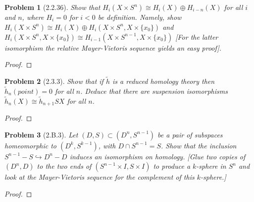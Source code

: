 \documentclass[10pt]{article}
\newcommand{\sk}{\vskip 10mm}
\newcommand{\rh}{\widetilde{h}}
\theoremstyle{plain}
\newtheorem{problem}{Problem}
\theoremstyle{remark}
\begin{document}
\begin{problem}[2.2.36]
  Show that $H_i(X\times S^n)\cong H_i(X)\oplus H_{i-n}(X)$ for all $i$ and $n$,
  where $H_i=0$ for $i<0$ be definition. Namely, show
  $H_i(X\times S^n)\cong H_i(X)\oplus H_i(X\times S^n,X\times\{x_0\})$ and
  $H_i(X\times S^n,X\times\{x_0\})\cong H_{i-1}(X\times S^{n-1},X\times\{x_0\})$
  [For the latter isomorphism the relative Mayer-Vietoris sequence yields
  an easy proof].
\end{problem}

\begin{proof}
  
\end{proof}

\sk

\begin{problem}[2.3.3]
  Show that if $\rh$ is a reduced homology theory then $\rh_n(point)=0$ for all
  $n$. Deduce that there are suspension isomorphisms $\rh_n(X)\cong\rh_{n+1}SX$
  for all $n$.
\end{problem}

\begin{proof}
  
\end{proof}

\sk

\begin{problem}[2.B.3]
  Let $(D,S)\subset (D^n,S^{n-1})$ be a pair of subspaces homeomorphic to
  $(D^k,S^{k-1})$, with $D\cap S^{n-1}=S$. Show that the inclusion
  $S^{n-1}-S\hookrightarrow D^n-D$ induces an isomorphism on homology. [Glue two
  copies of $(D^n,D)$ to the two ends of $(S^{n-1}\times I,S\times I)$ to
  produce a $k$-sphere in $S^n$ and look at the Mayer-Vietoris sequence for the
  complement of this $k$-sphere.]
\end{problem}

\begin{proof}
  
\end{proof}

\end{document}

